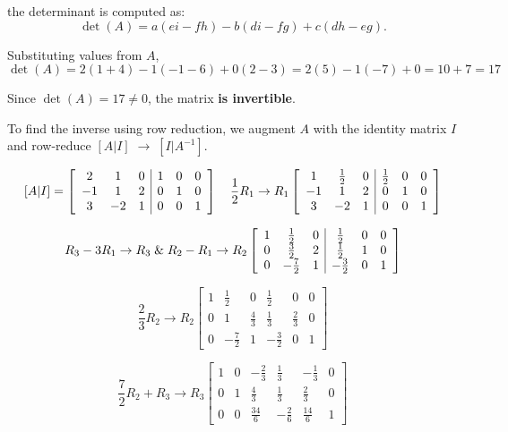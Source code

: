 \documentclass[a4paper,11pt,reqno]{amsart}
\numberwithin{equation}{section}
\begin{document}
\begin{enumerate}
\begin{center}
{{the determinant is computed as:
\[
\det(A) = a(ei - fh) - b(di - fg) + c(dh - eg).
\]

Substituting values from \( A \),
\[
\det(A)
= 2(1 + 4) - 1(-1 - 6) + 0(2 - 3)
= 2(5) - 1(-7) + 0
= 10 + 7 = 17
\]

Since \( \det(A) = 17 \neq 0 \), the matrix \textbf{is invertible}.

To find the inverse using row reduction, we augment \( A \) with the identity matrix \( I \) and row-reduce \( [A | I] \; \to \; [I | A^{-1}] \).

\[
[A | I] =
\left[\begin{array}{ccc|ccc} 
2 & 1 & 0 & 1 & 0 & 0 \\ 
-1 & 1 & 2 & 0 & 1 & 0 \\ 
3 & -2 & 1 & 0 & 0 & 1 
\end{array}
\right]
\\
\quad \frac{1}{2} R_1 \to R_1
\left[
\begin{array}{ccc|ccc} 
1 & \frac{1}{2} & 0 & \frac{1}{2} & 0 & 0 \\ 
-1 & 1 & 2 & 0 & 1 & 0 \\ 
3 & -2 & 1 & 0 & 0 & 1 
\end{array}
\right]
\]


\[
R_3 - 3R_1 \to R_3\\
\; \& \;R_2 - R_1 \to R_2
\left[
\begin{array}{ccc|ccc} 
1 & \frac{1}{2} & 0 & \frac{1}{2} & 0 & 0 \\ 
0 & \frac{3}{2} & 2 & \frac{1}{2} & 1 & 0 \\ 
0 & -\frac{7}{2} & 1 & -\frac{3}{2} & 0 & 1 
\end{array}
\right]
\]


\[
\frac{2}{3} R_2 \to R_2
\left[
\begin{array}{ccc|ccc} 
1 & \frac{1}{2} & 0 & \frac{1}{2} & 0 & 0 \\ 
0 & 1 & \frac{4}{3} & \frac{1}{3} & \frac{2}{3} & 0 \\ 
0 & -\frac{7}{2} & 1 & -\frac{3}{2} & 0 & 1 
\end{array}
\right]
\]


\[
\frac{7}{2}  R_2 +  R_3 \to R_3
\left[
\begin{array}{ccc|ccc} 
1 & 0 & -\frac{2}{3} & \frac{1}{3} & -\frac{1}{3} & 0 \\ 
0 & 1 & \frac{4}{3} & \frac{1}{3} & \frac{2}{3} & 0 \\ 
0 & 0 & \frac{34}{6} & -\frac{2}{6} & \frac{14}{6} & 1 
\end{array}
\right]
\]


}}
\end{center}
\end{enumerate}
\end{document}
